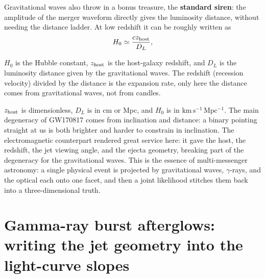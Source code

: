 Gravitational waves also throw in a bonus treasure, the \textbf{standard siren}: the amplitude of the merger waveform directly gives the luminosity distance, without needing the distance ladder. At low redshift it can be roughly written as
\begin{equation}
  H_0\simeq \frac{cz_{\rm host}}{D_L},
  \label{eq:e20-standard-siren}
\end{equation}
\begin{formulaexplain}
\(H_0\) is the Hubble constant, \(z_{\rm host}\) is the host-galaxy redshift, and \(D_L\) is the luminosity distance given by the gravitational waves. The redshift (recession velocity) divided by the distance is the expansion rate, only here the distance comes from gravitational waves, not from candles.
\end{formulaexplain}
\(z_{\rm host}\) is dimensionless, \(D_L\) is in cm or Mpc, and \(H_0\) is in \(\mathrm{km\,s^{-1}\,Mpc^{-1}}\). The main degeneracy of GW170817 comes from inclination and distance: a binary pointing straight at us is both brighter and harder to constrain in inclination. The electromagnetic counterpart rendered great service here: it gave the host, the redshift, the jet viewing angle, and the ejecta geometry, breaking part of the degeneracy for the gravitational waves. This is the essence of multi-messenger astronomy: a single physical event is projected by gravitational waves, \(\gamma\)-rays, and the optical each onto one facet, and then a joint likelihood stitches them back into a three-dimensional truth.

\section{Gamma-ray burst afterglows: writing the jet geometry into the light-curve slopes}
\label{sec:e20-grb}

